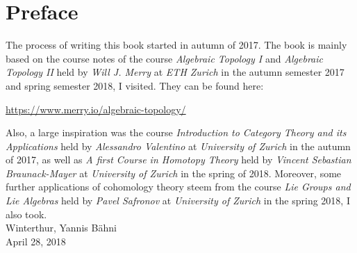 


\frontmatter

\chapter*{Preface}
The process of writing this book started in autumn of 2017. The book is mainly based on the course notes of the course \emph{Algebraic Topology I} and \emph{Algebraic Topology II} held by \emph{Will J. Merry} at \emph{ETH Zurich} in the autumn semester 2017 and spring semester 2018, I visited. They can be found here:
\begin{center}
	\href{https://www.merry.io/algebraic-topology/}{https://www.merry.io/algebraic-topology/}
\end{center}
Also, a large inspiration was the course \emph{Introduction to Category Theory and its Applications} held by \emph{Alessandro Valentino} at \emph{University of Zurich} in the autumn of 2017, as well as \emph{A first Course in Homotopy Theory} held by \emph{Vincent Sebastian Braunack-Mayer} at \emph{University of Zurich} in the spring of 2018. Moreover, some further applications of cohomology theory steem from the course \emph{Lie Groups and Lie Algebras} held by \emph{Pavel Safronov} at \emph{University of Zurich} in the spring 2018, I also took.\\

\noindent Winterthur, \hfill Yannis B\"ahni\\
April 28, 2018


\tableofcontents

\mainmatter










\appendix
\begin{appendix}
	
	
	
\end{appendix}



\printbibliography
\printindex

